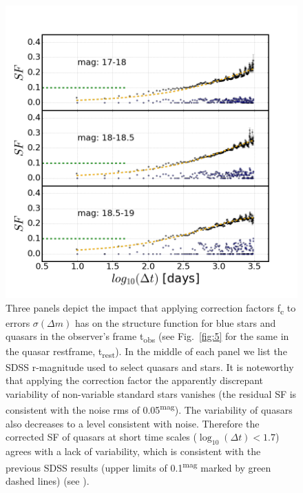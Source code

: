 \documentclass[fleqn,usenatbib]{mnras}  %
\begin{document}
\begin{figure}
\label{fig:4}
 \includegraphics[width=1.15\columnwidth, center]{Fig_4_SF_QSO_starsB_r_cut.png}
 \caption{Three panels depict the impact that applying correction factors f\textsubscript{c} to errors $\sigma(\Delta m)$ has on the structure function for blue stars and quasars in the observer's frame t\textsubscript{obs} (see Fig.~\ref{fig:5} for the same in the quasar restframe, t\textsubscript{rest}). In the middle of each panel we list the SDSS r-magnitude used to select quasars and stars. It is noteworthy that applying the correction factor the apparently discrepant variability of non-variable standard stars  vanishes (the residual SF is consistent with the noise rms of 0.05\textsuperscript{mag}). The variability of quasars also decreases  to a level consistent with noise. Therefore the corrected SF of quasars at short time scales ($\log_{10}(\Delta t) < 1.7$) agrees with a lack of variability, which is consistent with the previous SDSS results (upper limits of 0.1\textsuperscript{mag} marked by green dashed lines) (see \citep{macleod2011}).}
\end{figure}
\end{document}
